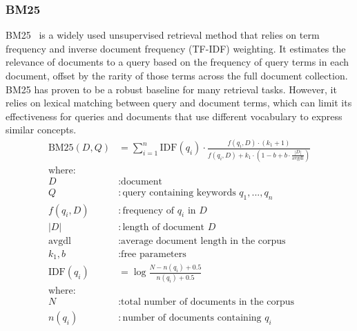 \subsubsection{BM25}
BM25~\cite{bm25} is a widely used unsupervised retrieval method that relies on term frequency and inverse document frequency (TF-IDF) weighting.
It estimates the relevance of documents to a query based on the frequency of query terms in each document, offset by the rarity of those terms across the full document collection.
BM25 has proven to be a robust baseline for many retrieval tasks.
However, it relies on lexical matching between query and document terms, which can limit its effectiveness for queries and documents that use different vocabulary to express similar concepts.
\begin{align*}
    \text{BM25}(D,Q) &= \sum_{i=1}^n \text{IDF}(q_i) \cdot \frac{f(q_i, D) \cdot (k_1 + 1)}{f(q_i, D) + k_1 \cdot (1 - b + b \cdot \frac{|D|}{\text{avgdl}})} \\[2ex]
    \text{where:} \\
    D &: \text{document} \\
    Q &: \text{query containing keywords } q_1, ..., q_n \\
    f(q_i, D) &: \text{frequency of } q_i \text{ in } D \\
    |D| &: \text{length of document } D \\
    \text{avgdl} &: \text{average document length in the corpus} \\
    k_1, b &: \text{free parameters} \\[2ex]
    \text{IDF}(q_i) &= \log \frac{N - n(q_i) + 0.5}{n(q_i) + 0.5} \\[2ex]
    \text{where:} \\
    N &: \text{total number of documents in the corpus} \\
    n(q_i) &: \text{number of documents containing } q_i
\end{align*}
%
%
%
%
%
%

